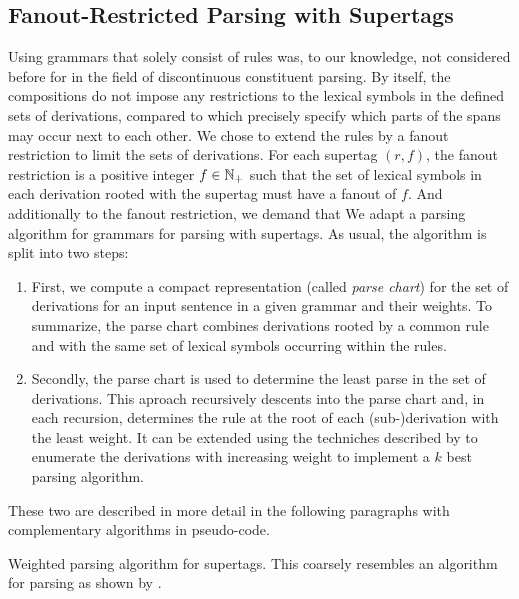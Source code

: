 \documentclass[../document.tex]{subfiles}
\begin{document}
    \subsection{Fanout-Restricted Parsing with  Supertags}\label{sec:parsing:dcp}
    Using grammars that solely consist of  rules was, to our knowledge, not considered before for in the field of discontinuous constituent parsing.
    By itself, the  compositions do not impose any restrictions to the lexical symbols in the defined sets of derivations, compared to  which precisely specify which parts of the spans may occur next to each other.
    We chose to extend the rules by a fanout restriction to limit the sets of derivations.
    For each  supertag \((r, f)\), the fanout restriction is a positive integer \(f \in \mathbb{N}_+\) such that the set of lexical symbols in each derivation rooted with the supertag must have a fanout of \(f\).
    And additionally to the fanout restriction, we demand that 
    We adapt a parsing algorithm for  grammars for parsing with  supertags.
    As usual, the algorithm is split into two steps:
    \begin{enumerate}
        \item \label{step:parsing:chart}
            First, we compute a compact representation (called \emph{parse chart}) for the set of derivations for an input sentence in a given grammar and their weights.
            To summarize, the parse chart combines derivations rooted by a common rule and with the same set of lexical symbols occurring within the rules.
        \item \label{step:parsing:derivation}
            Secondly, the parse chart is used to determine the least parse in the set of derivations.
            This aproach recursively descents into the parse chart and, in each recursion, determines the rule at the root of each (sub-)derivation with the least weight.
            It can be extended using the techniches described by \citet{HuaChia05} to enumerate the derivations with increasing weight to implement a \(k\) best parsing algorithm.
    \end{enumerate}
    These two are described in more detail in the following paragraphs with complementary algorithms in pseudo-code.
    
    \begin{algorithm}
        \caption{\label{alg:parsing:chart}
            Weighted parsing algorithm for  supertags.
            This coarsely resembles an algorithm for parsing  as shown by \citet[the ``na\"ive algorithm'' in section~3]{Burden05}.
        }
        
    \end{algorithm}
    
\end{document}
